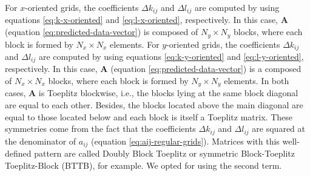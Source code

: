 For $x$-oriented grids, the coefficients $\Delta k_{ij}$ and $\Delta l_{ij}$ are 
computed by using equations \ref{eq:k-x-oriented} and \ref{eq:l-x-oriented}, respectively.
In this case, $\mathbf{A}$ (equation \ref{eq:predicted-data-vector}) is 
composed of $N_{y} \times N_{y}$ blocks, where each block is formed by $N_{x} \times N_{x}$ elements.
For $y$-oriented grids, the coefficients $\Delta k_{ij}$ and $\Delta l_{ij}$ are 
computed by using equations \ref{eq:k-y-oriented} and \ref{eq:l-y-oriented}, respectively.
In this case, $\mathbf{A}$ (equation \ref{eq:predicted-data-vector}) is a 
composed of $N_{x} \times N_{x}$ blocks, where each block is formed by $N_{y} \times N_{y}$ elements.
In both cases, $\mathbf{A}$ is Toeplitz blockwise, i.e., the blocks lying at the same block 
diagonal are equal to each other.
Besides, the blocks located above the main diagonal are equal to those 
located below and each block is itself a Toeplitz matrix.
These symmetries come from the fact that the coefficients
$\Delta k_{ij}$ and $\Delta l_{ij}$ are squared at the denominator of 
$a_{ij}$ (equation \ref{eq:aij-regular-grids}).
Matrices with this well-defined pattern are called 
Doubly Block Toeplitz \citep[][ p. 28]{jain1989} or symmetric Block-Toeplitz Toeplitz-Block (BTTB),
for example. We opted for using the second term.

